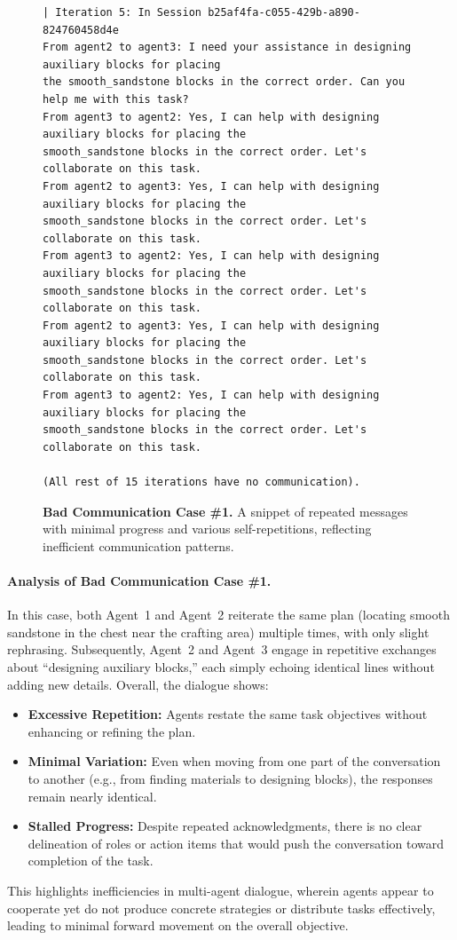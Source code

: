 \begin{figure}[htbp]
\begin{tcolorbox}[
    title=\textbf{Bad Communication Case \#1},
    colback=red!1!white,
    colframe=red!50!black,
    fonttitle=\bfseries
]
\begin{verbatim}
| Iteration 5: In Session b25af4fa-c055-429b-a890-824760458d4e
From agent2 to agent3: I need your assistance in designing auxiliary blocks for placing 
the smooth_sandstone blocks in the correct order. Can you help me with this task?
From agent3 to agent2: Yes, I can help with designing auxiliary blocks for placing the 
smooth_sandstone blocks in the correct order. Let's collaborate on this task.
From agent2 to agent3: Yes, I can help with designing auxiliary blocks for placing the 
smooth_sandstone blocks in the correct order. Let's collaborate on this task.
From agent3 to agent2: Yes, I can help with designing auxiliary blocks for placing the 
smooth_sandstone blocks in the correct order. Let's collaborate on this task.
From agent2 to agent3: Yes, I can help with designing auxiliary blocks for placing the 
smooth_sandstone blocks in the correct order. Let's collaborate on this task.
From agent3 to agent2: Yes, I can help with designing auxiliary blocks for placing the 
smooth_sandstone blocks in the correct order. Let's collaborate on this task.

(All rest of 15 iterations have no communication).  
\end{verbatim}

\end{tcolorbox}
\caption{\textbf{Bad Communication Case \#1.} A snippet of repeated messages with minimal progress 
and various self-repetitions, reflecting inefficient communication patterns.}
\label{fig:bad_comm_case_3}
\end{figure}

\paragraph{Analysis of Bad Communication Case \#1.}
In this case, both Agent~1 and Agent~2 reiterate the same plan (locating smooth sandstone in the chest near the crafting area) multiple times, with only slight rephrasing. Subsequently, Agent~2 and Agent~3 engage in repetitive exchanges about “designing auxiliary blocks,” each simply echoing identical lines without adding new details. Overall, the dialogue shows:
\begin{itemize}
    \item \textbf{Excessive Repetition:} Agents restate the same task objectives without enhancing or refining the plan.
    \item \textbf{Minimal Variation:} Even when moving from one part of the conversation to another (e.g., from finding materials to designing blocks), the responses remain nearly identical.
    \item \textbf{Stalled Progress:} Despite repeated acknowledgments, there is no clear delineation of roles or action items that would push the conversation toward completion of the task.
\end{itemize}
This highlights inefficiencies in multi-agent dialogue, wherein agents appear to cooperate yet do not produce concrete strategies or distribute tasks effectively, leading to minimal forward movement on the overall objective.



